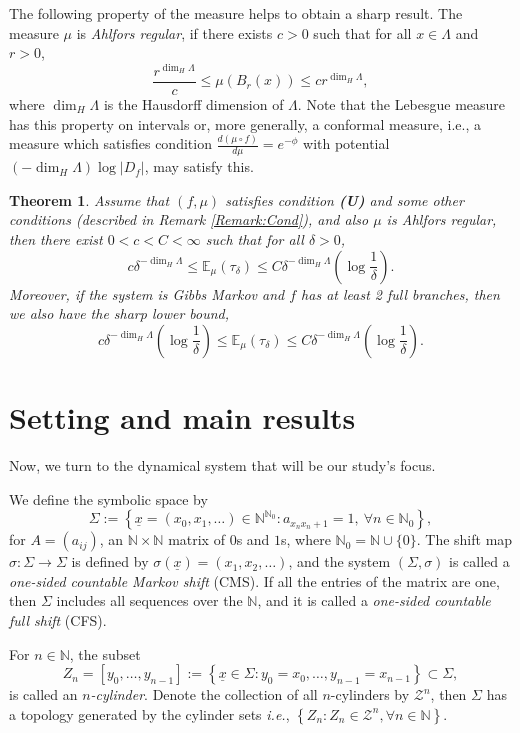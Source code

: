 \documentclass[11pt, reqno]{amsart}
\theoremstyle{plain}%
\newtheorem{theorem}{Theorem}[section]
\theoremstyle{definition}
\theoremstyle{definition}
\def\N{\ensuremath{\mathbb N}}
\def\ie{{\em i.e.}, }
\def\E{\mathbb E}
\def\st{such that }
\def\ulx{\underline{x}}
\numberwithin{equation}{section}
\begin{document}
The following property of the measure helps to obtain a sharp result. The measure $\mu$ is \textit{Ahlfors regular}, if there exists $c>0$ \st for all $x\in \Lambda$ and $r>0$, $$\frac{r^{\dim_H\Lambda}}{c}\le\mu(B_r(x))\le cr^{\dim_H\Lambda},$$  where $\dim_H\Lambda$ is the Hausdorff dimension of $\Lambda$. Note that the Lebesgue measure has this property on intervals or, more generally, a conformal measure, i.e., a measure which satisfies condition $\frac{d(\mu \circ f)}{d\mu}=e^{-\phi}$ with potential $\left(-\dim_H\Lambda\right)\log \left|D_f\right|$, may satisfy this.

\begin{theorem}\label{Th:MN_sharp_theorem}
    \cite[Theorem 2.1]{MikeNatali} Assume that $(f,\mu)$ satisfies condition \textbf{(U)} and some other conditions (described in Remark \ref{Remark:Cond}), and also $\mu$ is \textit{Ahlfors regular}, then there exist $0<c<C<\infty$ such that for all $\delta>0$,
    $$c \delta^{{-\dim_H\Lambda}} \le\E_\mu(\tau_\delta)\le C \delta^{{-\dim_H\Lambda}} \left(\log\frac1{\delta}\right).$$
   Moreover, if the system is Gibbs Markov and $f$ has at least 2 full branches, then we also have the sharp lower bound,
    $$c \delta^{{-\dim_H\Lambda}} \left(\log\frac1{\delta}\right)\le\E_\mu(\tau_\delta)\le C \delta^{{-\dim_H\Lambda}} \left(\log\frac1{\delta}\right).$$
  
\end{theorem}


\section{Setting and main results}\label{Sec: CFS and main Thm}
Now, we turn to the dynamical system that will be our study's focus.

We define the symbolic space by 
$$\Sigma:=\left\{\ulx=(x_0,x_1,\ldots)\in\N^{\N_0}:a_{x_nx_n+1}=1,\ \forall n\in {\N_0}\right\},$$
for $A=(a_{ij})$, an $\N \times\N$ matrix of $0$s and $1$s, where $\N_0=\N\cup\{0\}$. The shift map $\sigma:\Sigma\to\Sigma$ is defined by $\sigma(\ulx)=(x_1, x_2, \ldots)$, and the system $(\Sigma,\sigma)$ is called a \textit{one-sided countable Markov shift} (CMS). If all the entries of the matrix are one, then $\Sigma$ includes all sequences over the $\N$, and it is called a \textit{one-sided countable full shift} (CFS).


For $n\in\N$, the subset $$Z_n=[y_0,\ldots,y_{n-1}]:=\left\{\ulx\in\Sigma : y_0=x_0,\ldots,y_{n-1}=x_{n-1}\right\}\subset\Sigma,$$ is called an \textit{$n$-cylinder}. Denote the collection of all $n$-cylinders by $\mathcal{Z}^n$, then $\Sigma$ has a topology generated by the cylinder sets \ie $\left\{Z_n:Z_n\in \mathcal{Z}^n, \forall n\in\N\right\}$.
\end{document}
